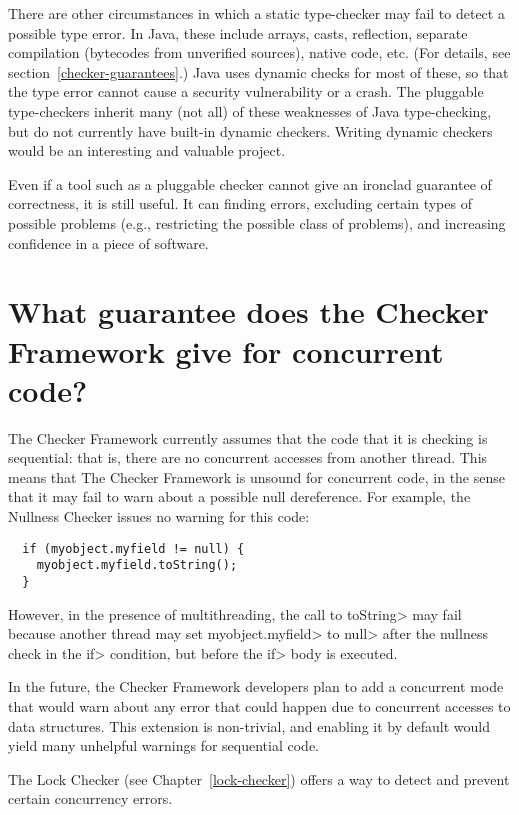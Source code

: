 There are other circumstances in which a static type-checker may fail to
detect a possible type error.  In Java, these include arrays, casts,
reflection, separate compilation (bytecodes from unverified sources),
native code, etc.  (For details, see section~\ref{checker-guarantees}.)
Java uses dynamic checks for most of these, so that the
type error cannot cause a security vulnerability or a crash.  The pluggable
type-checkers inherit many (not all) of these weaknesses of Java
type-checking, but do not currently have built-in dynamic checkers.
Writing dynamic checkers would be an interesting and valuable project.


Even if a tool such as a pluggable checker cannot give an ironclad
guarantee of correctness, it is still useful.  It can finding errors, 
excluding certain types of possible problems (e.g., restricting the
possible class of problems), and increasing confidence in a piece of
software.


\section{What guarantee does the Checker Framework give for concurrent code?\label{faq-concurrency}}

The Checker Framework currently assumes that the code that it is checking
is sequential:  that is, there are no concurrent accesses from another
thread.  This means that The Checker Framework is unsound for concurrent
code, in the sense that it may fail to warn about a possible null
dereference.  For example, the Nullness Checker issues no warning for this
code:

\begin{Verbatim}
  if (myobject.myfield != null) {
    myobject.myfield.toString();
  }
\end{Verbatim}

\noindent
However, in the presence of multithreading, the call to \<toString> may
fail because another thread may set \<myobject.myfield> to \<null> after
the nullness check in the \<if> condition, but before the \<if> body is
executed.

In the future, the Checker Framework developers plan to add a concurrent
mode that would warn about any error that could happen due to concurrent
accesses to data structures.  This extension is non-trivial, and enabling
it by default would yield many unhelpful warnings for sequential code.

The Lock Checker (see Chapter~\ref{lock-checker}) offers a way to detect
and prevent certain concurrency errors.


